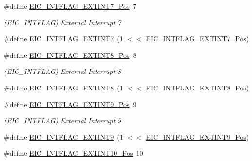 \begin{DoxyCompactItemize}
\item 
\#define \mbox{\hyperlink{group___s_a_m_d21___e_i_c_gaeb26fb4cfd061bac8196dc3b13855606}{E\+I\+C\+\_\+\+I\+N\+T\+F\+L\+A\+G\+\_\+\+E\+X\+T\+I\+N\+T7\+\_\+\+Pos}}~7
\begin{DoxyCompactList}\small\item\em (E\+I\+C\+\_\+\+I\+N\+T\+F\+L\+AG) External Interrupt 7 \end{DoxyCompactList}\item 
\#define \mbox{\hyperlink{group___s_a_m_d21___e_i_c_gafe39159c3ac629b3f6fdd5f908f972e1}{E\+I\+C\+\_\+\+I\+N\+T\+F\+L\+A\+G\+\_\+\+E\+X\+T\+I\+N\+T7}}~(1 $<$$<$ \mbox{\hyperlink{group___s_a_m_d21___e_i_c_gaeb26fb4cfd061bac8196dc3b13855606}{E\+I\+C\+\_\+\+I\+N\+T\+F\+L\+A\+G\+\_\+\+E\+X\+T\+I\+N\+T7\+\_\+\+Pos}})
\item 
\#define \mbox{\hyperlink{group___s_a_m_d21___e_i_c_gade057b6002352d804b6e2bb3ec640bfe}{E\+I\+C\+\_\+\+I\+N\+T\+F\+L\+A\+G\+\_\+\+E\+X\+T\+I\+N\+T8\+\_\+\+Pos}}~8
\begin{DoxyCompactList}\small\item\em (E\+I\+C\+\_\+\+I\+N\+T\+F\+L\+AG) External Interrupt 8 \end{DoxyCompactList}\item 
\#define \mbox{\hyperlink{group___s_a_m_d21___e_i_c_ga77b3b3f789474cad01794fc460a70a94}{E\+I\+C\+\_\+\+I\+N\+T\+F\+L\+A\+G\+\_\+\+E\+X\+T\+I\+N\+T8}}~(1 $<$$<$ \mbox{\hyperlink{group___s_a_m_d21___e_i_c_gade057b6002352d804b6e2bb3ec640bfe}{E\+I\+C\+\_\+\+I\+N\+T\+F\+L\+A\+G\+\_\+\+E\+X\+T\+I\+N\+T8\+\_\+\+Pos}})
\item 
\#define \mbox{\hyperlink{group___s_a_m_d21___e_i_c_ga0f1ade503ec9f21497973b67e86f55c6}{E\+I\+C\+\_\+\+I\+N\+T\+F\+L\+A\+G\+\_\+\+E\+X\+T\+I\+N\+T9\+\_\+\+Pos}}~9
\begin{DoxyCompactList}\small\item\em (E\+I\+C\+\_\+\+I\+N\+T\+F\+L\+AG) External Interrupt 9 \end{DoxyCompactList}\item 
\#define \mbox{\hyperlink{group___s_a_m_d21___e_i_c_ga563d592e519bb18ad95d131642d126f4}{E\+I\+C\+\_\+\+I\+N\+T\+F\+L\+A\+G\+\_\+\+E\+X\+T\+I\+N\+T9}}~(1 $<$$<$ \mbox{\hyperlink{group___s_a_m_d21___e_i_c_ga0f1ade503ec9f21497973b67e86f55c6}{E\+I\+C\+\_\+\+I\+N\+T\+F\+L\+A\+G\+\_\+\+E\+X\+T\+I\+N\+T9\+\_\+\+Pos}})
\item 
\#define \mbox{\hyperlink{group___s_a_m_d21___e_i_c_ga3a5d49fb3642d219f967a907b657507d}{E\+I\+C\+\_\+\+I\+N\+T\+F\+L\+A\+G\+\_\+\+E\+X\+T\+I\+N\+T10\+\_\+\+Pos}}~10
$$
\end{DoxyCompactItemize}
